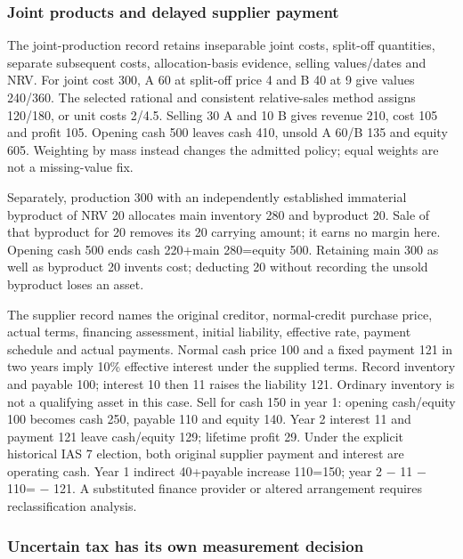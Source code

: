 \hypertarget{joint-products-and-delayed-supplier-payment}{%
\subsubsection{Joint products and delayed supplier payment}\label{joint-products-and-delayed-supplier-payment}}

The joint-production record retains inseparable joint costs, split-off quantities, separate subsequent costs, allocation-basis evidence, selling values/dates and NRV. For joint cost 300, A 60 at split-off price 4 and B 40 at 9 give values 240/360. The selected rational and consistent relative-sales method assigns 120/180, or unit costs 2/4.5. Selling 30 A and 10 B gives revenue 210, cost 105 and profit 105. Opening cash 500 leaves cash 410, unsold A 60/B 135 and equity 605. Weighting by mass instead changes the admitted policy; equal weights are not a missing-value fix.

Separately, production 300 with an independently established immaterial byproduct of NRV 20 allocates main inventory 280 and byproduct 20. Sale of that byproduct for 20 removes its 20 carrying amount; it earns no margin here. Opening cash 500 ends cash 220+main 280=equity 500. Retaining main 300 as well as byproduct 20 invents cost; deducting 20 without recording the unsold byproduct loses an asset.

The supplier record names the original creditor, normal-credit purchase price, actual terms, financing assessment, initial liability, effective rate, payment schedule and actual payments. Normal cash price 100 and a fixed payment 121 in two years imply 10\% effective interest under the supplied terms. Record inventory and payable 100; interest 10 then 11 raises the liability 121. Ordinary inventory is not a qualifying asset in this case. Sell for cash 150 in year 1: opening cash/equity 100 becomes cash 250, payable 110 and equity 140. Year 2 interest 11 and payment 121 leave cash/equity 129; lifetime profit 29. Under the explicit historical IAS 7 election, both original supplier payment and interest are operating cash. Year 1 indirect 40+payable increase 110=150; year 2 − 11 − 110= − 121. A substituted finance provider or altered arrangement requires reclassification analysis.

\hypertarget{uncertain-tax-has-its-own-measurement-decision}{%
\subsubsection{Uncertain tax has its own measurement decision}\label{uncertain-tax-has-its-own-measurement-decision}}

